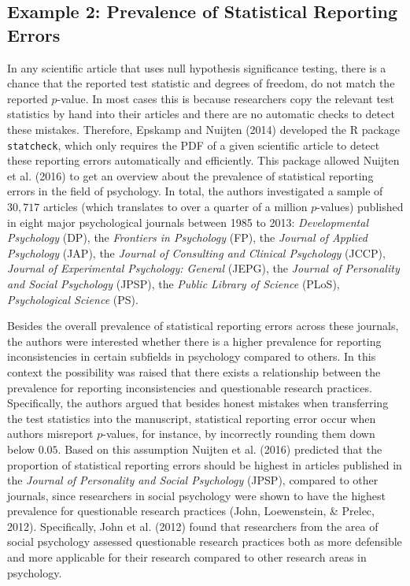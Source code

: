 \documentclass[
  english,
  man,floatsintext]{apa6}
\begin{document}
\hypertarget{example-2-prevalence-of-statistical-reporting-errors}{%
\subsection{Example 2: Prevalence of Statistical Reporting Errors}\label{example-2-prevalence-of-statistical-reporting-errors}}

In any scientific article that uses null hypothesis significance testing, there is a chance that the reported test statistic and degrees of freedom, do not match the reported \(p\)-value. In most cases this is because researchers copy the relevant test statistics by hand into their articles and there are no automatic checks to detect these mistakes. Therefore, Epskamp and Nuijten (2014) developed the R package \texttt{statcheck}, which only requires the PDF of a given scientific article to detect these reporting errors automatically and efficiently. This package allowed Nuijten et al. (2016) to get an overview about the prevalence of statistical reporting errors in the field of psychology. In total, the authors investigated a sample of \(30{,}717\) articles (which translates to over a quarter of a million \(p\)-values) published in eight major psychological journals between 1985 to 2013: \emph{Developmental Psychology} (DP), the \emph{Frontiers in Psychology} (FP), the \emph{Journal of Applied Psychology} (JAP), the \emph{Journal of Consulting and Clinical Psychology} (JCCP), \emph{Journal of Experimental Psychology: General} (JEPG), the \emph{Journal of Personality and Social Psychology} (JPSP), the \emph{Public Library of Science} (PLoS), \emph{Psychological Science} (PS).

Besides the overall prevalence of statistical reporting errors across these journals, the authors were interested whether there is a higher prevalence for reporting inconsistencies in certain subfields in psychology compared to others. In this context the possibility was raised that there exists a relationship between the prevalence for reporting inconsistencies and questionable research practices. Specifically, the authors argued that besides honest mistakes when transferring the test statistics into the manuscript, statistical reporting error occur when authors misreport \(p\)-values, for instance, by incorrectly rounding them down below \(0.05\). Based on this assumption Nuijten et al. (2016) predicted that the proportion of statistical reporting errors should be highest in articles published in the \emph{Journal of Personality and Social Psychology} (JPSP), compared to other journals, since researchers in social psychology were shown to have the highest prevalence for questionable research practices (John, Loewenstein, \& Prelec, 2012). Specifically, John et al. (2012) found that researchers from the area of social psychology assessed questionable research practices both as more defensible and more applicable for their research compared to other research areas in psychology.
\end{document}
